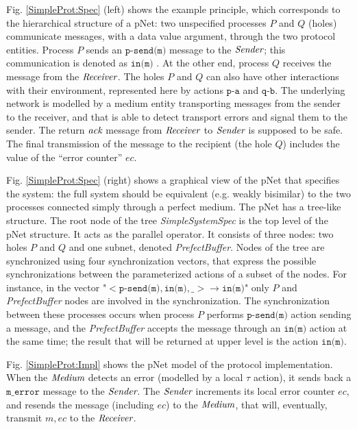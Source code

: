 \documentclass{lmcs}
\newcommand{\nounderline}[1]{#1}
\begin{document}
Fig. \ref{SimpleProt:Spec} (left) shows the example principle, which corresponds to the hierarchical structure of a pNet: two unspecified
processes $P$ and $Q$ (holes) communicate messages, with a data value
argument, through the two protocol entities. Process $P$ sends an $\texttt{p-send(m)}$ message to the $\symb{Sender}$; this communication is denoted as $\texttt{\nounderline{in(m)}}$%
.
At the other end, process $Q$ receives the message from the $\symb{Receiver}$. The holes $P$ and $Q$ can also have other interactions with their environment, represented here by actions $\texttt{p-a}$ and $\texttt{q-b}$. The underlying network is modelled by a medium entity transporting messages from the sender to the receiver, and that is able to detect transport errors and signal them to the sender. The return $\symb{ack}$ message from $\symb{Receiver}$ to $\symb{Sender}$ is supposed to be safe. The final transmission of the message to the recipient (the hole $Q$) includes the value of the ``error counter'' $ec$.


Fig. \ref{SimpleProt:Spec} (right) shows a graphical view of the pNet that specifies the system:
the full system should be equivalent (e.g.  weakly bisimilar)
to the two processes connected simply through a perfect medium.  
The pNet has a tree-like structure.  The root node of the tree {\it SimpleSystemSpec} is the top level of the pNet structure. It acts as the parallel operator. It consists of three nodes: two holes $P$ and $Q$ and one subnet, denoted {\it PrefectBuffer}. Nodes of the tree are synchronized using four synchronization vectors, that  express the possible synchronizations between the parameterized actions of a subset of the nodes. For instance, in the vector "$< \texttt{p-send(m)},\texttt{in(m)},\_> \rightarrow \texttt{\nounderline{in(m)}}$" only $P$ and {\it PrefectBuffer} nodes are involved in the synchronization. The synchronization between these processes occurs when  process $P$  performs $\texttt{p-send(m)}$  action sending a message, and  the {\it PrefectBuffer} accepts the message through an $\texttt{in(m)}$ action  at the same time; the result that will be returned at upper level is the action  $\texttt{\nounderline{in(m)}}$.


Fig. \ref{SimpleProt:Impl} shows the pNet model of the protocol implementation. When the $\symb{Medium}$ detects an error (modelled by a local $\tau$ action), it sends back a $\texttt{m\_error}$ message to the $\symb{Sender}$. The $\symb{Sender}$ increments its local error counter $ec$, and resends the message (including $ec$) to the $\symb{Medium}$, that will, eventually, transmit $m,ec$ to the $\symb{Receiver}$. 
\end{document}
